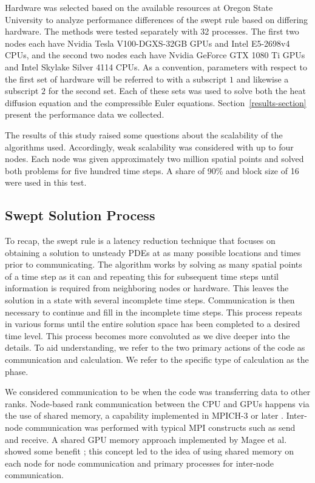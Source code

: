 \documentclass[preprints,article,accept,moreauthors,pdftex]{Definitions/mdpi}
\def\oldCPU{Intel Skylake Silver 4114} %
\def\oldGPU{Nvidia GeForce GTX 1080 Ti}
\def\newCPU{Intel E5-2698v4} %
\def\newGPU{Nvidia Tesla V100-DGXS-32GB}
\begin{document}
Hardware was selected based on the available resources at Oregon State University to analyze performance differences of the swept rule based on differing hardware. The methods were tested separately with 32 processes. The first two nodes each have \newGPU{} GPUs and \newCPU{} CPUs, and the second two nodes each have \oldGPU{} GPUs and \oldCPU{} CPUs. As a convention, parameters with respect to the first set of hardware will be referred to with a subscript $1$ and likewise a subscript $2$ for the second set. Each of these sets was used to solve both the heat diffusion equation and the compressible Euler equations. Section~\ref{results-section} present the performance data we collected. 

The results of this study raised some questions about the scalability of the algorithms used. Accordingly, weak scalability was considered with up to four nodes. Each node was given approximately two million spatial points and solved both problems for five hundred time steps. A share of 90\% and block size of 16 were used in this test. 

\subsection{Swept Solution Process}
\label{swept-process-section}

To recap, the swept rule is a latency reduction technique that focuses on obtaining a solution to unsteady PDEs at as many possible locations and times prior to communicating. The algorithm works by solving as many spatial points of a time step as it can and repeating this for subsequent time steps until information is required from neighboring nodes or hardware. This leaves the solution in a state with several incomplete time steps. Communication is then necessary to continue and fill in the incomplete time steps. This process repeats in various forms until the entire solution space has been completed to a desired time level. This process becomes more convoluted as we dive deeper into the details. To aid understanding, we refer to the two primary actions of the code as communication and calculation. We refer to the specific type of calculation as the phase. 

We considered communication to be when the code was transferring data to other ranks. Node-based rank communication between the CPU and GPUs happens via the use of shared memory, a capability implemented in MPICH-3 or later \cite{Hoefler2013MPIMemory}. Inter-node communication was performed with typical MPI constructs such as send and receive. A shared GPU memory approach implemented by Magee et al. showed some benefit \cite{Magee2018AcceleratingDecomposition}; this concept led to the idea of using shared memory on each node for node communication and primary processes for inter-node communication.
 
\end{document}
